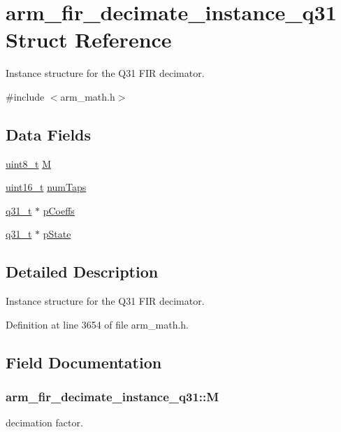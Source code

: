 \hypertarget{structarm__fir__decimate__instance__q31}{\section{arm\-\_\-fir\-\_\-decimate\-\_\-instance\-\_\-q31 Struct Reference}
\label{structarm__fir__decimate__instance__q31}
}


Instance structure for the Q31 F\-I\-R decimator.  




{\ttfamily \#include $<$arm\-\_\-math.\-h$>$}

\subsection*{Data Fields}
\begin{DoxyCompactItemize}
\item 
\hyperlink{stdint_8h_aba7bc1797add20fe3efdf37ced1182c5}{uint8\-\_\-t} \hyperlink{structarm__fir__decimate__instance__q31_ad3d6936c36303b30dd38f1eddf248ae5}{M}
\item 
\hyperlink{stdint_8h_a273cf69d639a59973b6019625df33e30}{uint16\-\_\-t} \hyperlink{structarm__fir__decimate__instance__q31_a37915d42b0dc5e3057ebe83110798482}{num\-Taps}
\item 
\hyperlink{arm__math_8h_adc89a3547f5324b7b3b95adec3806bc0}{q31\-\_\-t} $\ast$ \hyperlink{structarm__fir__decimate__instance__q31_a030d0391538c2481c5b348fd09a952ff}{p\-Coeffs}
\item 
\hyperlink{arm__math_8h_adc89a3547f5324b7b3b95adec3806bc0}{q31\-\_\-t} $\ast$ \hyperlink{structarm__fir__decimate__instance__q31_a0ef0ef9e265f7ab873cfc6daa7593fdb}{p\-State}
\end{DoxyCompactItemize}


\subsection{Detailed Description}
Instance structure for the Q31 F\-I\-R decimator. 

Definition at line 3654 of file arm\-\_\-math.\-h.



\subsection{Field Documentation}
\hypertarget{structarm__fir__decimate__instance__q31_ad3d6936c36303b30dd38f1eddf248ae5}{
\subsubsection[{M}]{ arm\-\_\-fir\-\_\-decimate\-\_\-instance\-\_\-q31\-::\-M}}\label{structarm__fir__decimate__instance__q31_ad3d6936c36303b30dd38f1eddf248ae5}
decimation factor. 

